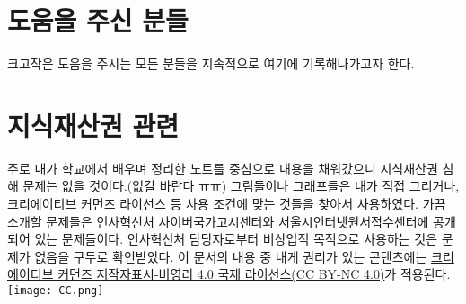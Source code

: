 \section{도움을 주신 분들}
크고작은 도움을 주시는 모든 분들을 지속적으로 여기에 기록해나가고자 한다.

\section{지식재산권 관련}
주로 내가 학교에서 배우며 정리한 노트를 중심으로 내용을 채워갔으니 지식재산권 침해 문제는 없을 것이다.(없길 바란다 ㅠㅠ) 
그림들이나 그래프들은 내가 직접 그리거나, 크리에이티브 커먼즈 라이선스 등 사용 조건에 맞는 것들을 찾아서 사용하였다.
가끔 소개할 문제들은 \href{https://www.gosi.kr}{인사혁신처 사이버국가고시센터}와 \href{http://gosi.seoul.go.kr}{서울시인터넷원서접수센터}에 공개되어 있는 문제들이다.
인사혁신처 담당자로부터 비상업적 목적으로 사용하는 것은 문제가 없음을 구두로 확인받았다.
이 문서의 내용 중 내게 권리가 있는 콘텐츠에는 \href{https://creativecommons.org/licenses/by-nc/4.0/}{크리에이티브 커먼즈 저작자표시-비영리 4.0 국제 라이선스(CC BY-NC 4.0)}가 적용된다.
\\
\texttt{[image: CC.png]}